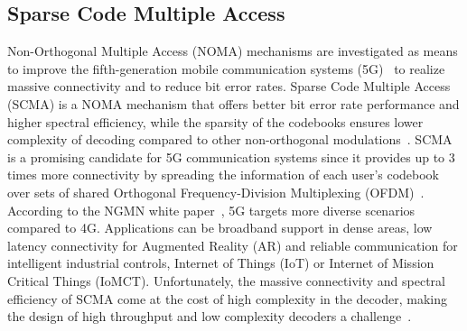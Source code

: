 \subsection{Sparse Code Multiple Access}
\label{sec:ctx_scma}


Non-Orthogonal Multiple Access (NOMA) mechanisms are investigated as means to
improve the fifth-generation mobile communication systems (5G)~\cite{Islam2017}
to realize massive connectivity and to reduce bit error rates. Sparse Code
Multiple Access (SCMA) is a NOMA mechanism that offers better bit error rate
performance and higher spectral efficiency, while the sparsity of the codebooks
ensures lower complexity of decoding compared to other non-orthogonal
modulations~\cite{Nikopour2013}. SCMA is a promising candidate for 5G
communication systems since it provides up to 3 times more connectivity by
spreading the information of each user's codebook over sets of shared Orthogonal
Frequency-Division Multiplexing (OFDM)~\cite{Altera2015}. According to the NGMN
white paper~\cite{Alliance2015}, 5G targets more diverse scenarios compared to
4G. Applications can be broadband support in dense areas, low latency
connectivity for Augmented Reality (AR) and reliable communication for
intelligent industrial controls, Internet of Things (IoT) or Internet of Mission
Critical Things (IoMCT). Unfortunately, the massive connectivity and spectral
efficiency of SCMA come at the cost of high complexity in the decoder, making
the design of high throughput and low complexity decoders a
challenge~\cite{Lu2015}.

